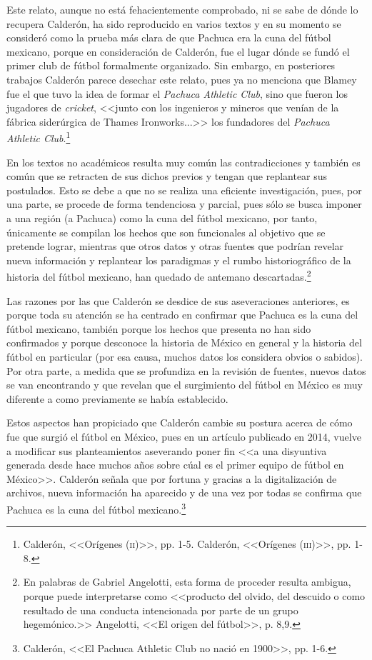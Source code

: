 \documentclass[11pt,a5paper,twoside]{book} %
\begin{document}
Este relato, aunque no está fehacientemente comprobado, ni se sabe de dónde lo
recupera Calderón, ha sido reproducido en varios textos y en su momento se consideró como
la prueba más clara de que Pachuca era la cuna del fútbol mexicano, porque en consideración
de Calderón, fue el lugar dónde se fundó el primer club de fútbol formalmente organizado.
Sin embargo, en posteriores trabajos Calderón parece desechar este relato, pues ya no
menciona que Blamey fue el que tuvo la idea de formar el \emph{Pachuca Athletic Club}, sino que fueron los jugadores de \emph{cricket}, <<junto con los ingenieros y mineros que venían de la fábrica siderúrgica de Thames Ironworks...>> los fundadores del \emph{Pachuca Athletic Club}.\footnote{Calderón, <<Orígenes (\textsc{ii})>>, pp. 1-5. Calderón, <<Orígenes (\textsc{iii})>>, pp. 1-8.}

En los textos no académicos resulta muy común las contradicciones y también es
común que se retracten de sus dichos previos y tengan que replantear sus postulados. Esto se
debe a que no se realiza una eficiente investigación, pues, por una parte, se procede de forma
tendenciosa y parcial, pues sólo se busca imponer a una región (a Pachuca) como la cuna del
fútbol mexicano, por tanto, únicamente se compilan los hechos que son funcionales al
objetivo que se pretende lograr, mientras que otros datos y otras fuentes que podrían revelar nueva información y replantear los paradigmas y el rumbo historiográfico de la historia del
fútbol mexicano, han quedado de antemano descartadas.\footnote{En palabras de Gabriel Angelotti, esta forma de proceder resulta ambigua, porque puede interpretarse como <<producto del olvido, del descuido o como resultado de una conducta intencionada por parte de un grupo hegemónico.>> Angelotti, <<El origen del fútbol>>, p. 8,9.}

Las razones por las que Calderón se desdice de sus aseveraciones anteriores, es
porque toda su atención se ha centrado en confirmar que Pachuca es la cuna del fútbol
mexicano, también porque los hechos que presenta no han sido confirmados y porque
desconoce la historia de México en general y la historia del fútbol en particular (por esa
causa, muchos datos los considera obvios o sabidos). Por otra parte, a medida que se
profundiza en la revisión de fuentes, nuevos datos se van encontrando y que revelan que el
surgimiento del fútbol en México es muy diferente a como previamente se había establecido.

Estos aspectos han propiciado que Calderón cambie su postura acerca de cómo fue
que surgió el fútbol en México, pues en un artículo publicado en 2014, vuelve a modificar sus planteamientos aseverando poner fin <<a una disyuntiva generada desde hace muchos años sobre cúal es el primer equipo de fútbol en México>>. Calderón señala que por fortuna y gracias a la digitalización de archivos, nueva información ha aparecido y de una vez por todas se confirma que Pachuca es la cuna del fútbol mexicano.\footnote{Calderón, <<El Pachuca Athletic Club no nació en 1900>>, pp. 1-6.}
\end{document}

